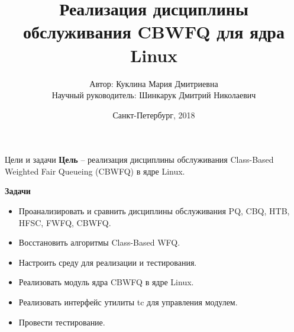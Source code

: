 \documentclass[12pt]{beamer}
\title[Реализация CBWFQ в ядре Linux]{Реализация дисциплины обслуживания CBWFQ для ядра Linux}
\author[]{{\small Автор: Куклина Мария Дмитриевна\\ Научный руководитель: Шинкарук Дмитрий Николаевич}}
\institute[]{Университет ИТМО}
\date[]{Санкт-Петербург, 2018}
\begin{document}
\setcounter{figure}{0}

\newcommand{\mc}[0]{\makecell}
\newcommand\setrow[1]{\gdef\rowmac{#1}#1\ignorespaces}
\newcommand\clearrow{\global\let\rowmac\relax}
\clearrow

\begin{darkbars}
    \begin{frame}
        \titlepage
    \end{frame}
\end{darkbars}

\begin{frame}{Цели и задачи}
    \textbf{Цель} -- реализация дисциплины обслуживания Class-Based Weighted Fair Queueing
    (CBWFQ) в ядре Linux. \newline

    \textbf{Задачи}
    {\small
        \begin{itemize}

    \item Проанализировать и сравнить дисциплины обслуживания PQ, CBQ, HTB, HFSC, FWFQ, CBWFQ.
    \item Восстановить алгоритмы Class-Based WFQ.
    \item Настроить среду для реализации и тестирования.
    \item Реализовать модуль ядра CBWFQ в ядре Linux.
    \item Реализовать интерфейс утилиты tc для управления модулем.
    \item Провести тестирование.
        \end{itemize}
    }
\end{frame}
\end{document}
